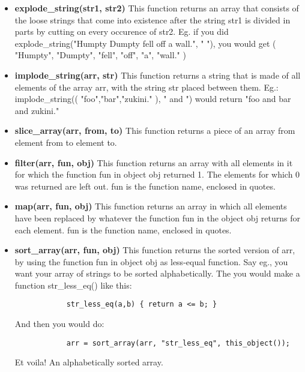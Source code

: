 \begin{itemize}
\item{\bf explode\_string(str1, str2)}
         This function returns an array that consists of the loose strings
         that come into existence after the string str1 is divided in parts
         by cutting on every occurence of str2. Eg. if you did
         explode\_string("Humpty Dumpty fell off a wall.", " "), you would get
         ({ "Humpty", "Dumpty", "fell", "off", "a", "wall." })

\item{\bf implode\_string(arr, str)}
         This function returns a string that is made of all elements of the
         array arr, with the string str placed between them. Eg.:
         implode\_string(({ "foo","bar","zukini." }), " and ") would return
         "foo and bar and zukini."  

\item{\bf slice\_array(arr, from, to)}
         This function returns a piece of an array from element from to
         element to.

\item{\bf filter(arr, fun, obj)}
         This function returns an array with all elements in it for which the
         function fun in object obj returned 1. The elements for which 0 was
         returned are left out. fun is the function name, enclosed in quotes.

\item{\bf map(arr, fun, obj)}
         This function returns an array in which all elements have been
         replaced by whatever the function fun in the object obj returns
         for each element. fun is the function name, enclosed in quotes.

\item{\bf sort\_array(arr, fun, obj)}
         This function returns the sorted version of arr, by using the
         function fun in object obj as less-equal function. Say eg., you
         want your array of strings to be sorted alphabetically. The you
         would make a function str\_less\_eq() like this:

        \begin{verbatim}
            str_less_eq(a,b) { return a <= b; }
        \end{verbatim}

         And then you would do:

        \begin{verbatim}
            arr = sort_array(arr, "str_less_eq", this_object());
        \end{verbatim}

         Et voila! An alphabetically sorted array.
\end{itemize}

